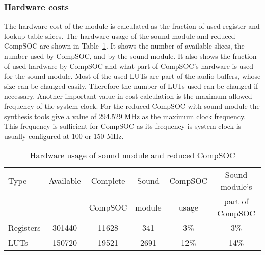 \subsubsection{Hardware costs}
The hardware cost of the module is calculated as the fraction of used register and lookup table slices. The hardware usage of the sound module and reduced CompSOC are shown in Table~\ref{table:hardware}. It shows the number of available slices, the number used by CompSOC, and by the sound module. It also shows the fraction of used hardware by CompSOC and what part of CompSOC's hardware is used for the sound module. Most of the used LUTs are part of the audio buffers, whose size can be changed easily. Therefore the number of LUTs used can be changed if necessary. Another important value in cost calculation is the maximum allowed frequency of the system clock. For the reduced CompSOC with sound module the synthesis tools give a value of 294.529 MHz  as the maximum clock frequency. This frequency is sufficient for CompSOC as its frequency is system clock is usually configured at 100 or 150 MHz.
\begin{table}[h]
 \setlength{\tabcolsep}{5pt}
 \centering
 \caption{Hardware usage of sound module and reduced CompSOC}
 \begin{tabular}{ | l || c | c | c | c | c | }
  \hline
  Type &Available 		& Complete 	& Sound 	& CompSOC 	& Sound module's \\
           & ~ 			& CompSOC 	& module 	& usage 	& part of CompSOC \\
  \hline
  Registers 	& 301440 	& 11628 	& 341 		& 3\% 	& 3\% 	\\
  LUTs 		& 150720 	& 19521 	& 2691 	& 12\% 	& 14\% 	\\
 \hline
 \end{tabular}
 \label{table:hardware} 
\end{table} 

